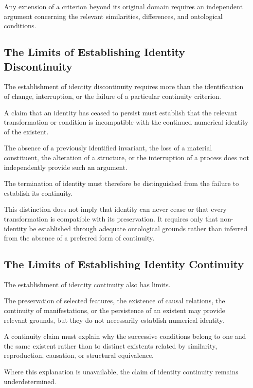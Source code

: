 Any extension of a criterion beyond its original
domain requires an independent argument concerning
the relevant similarities, differences, and
ontological conditions.

\subsection{The Limits of Establishing Identity Discontinuity}

The establishment of identity discontinuity
requires more than the identification of change,
interruption, or the failure of a particular
continuity criterion.

A claim that an identity has ceased to persist
must establish that the relevant transformation
or condition is incompatible with the continued
numerical identity of the existent.

The absence of a previously identified invariant,
the loss of a material constituent, the alteration
of a structure, or the interruption of a process
does not independently provide such an argument.

The termination of identity must therefore be
distinguished from the failure to establish
its continuity.

This distinction does not imply that identity
can never cease or that every transformation
is compatible with its preservation. It requires
only that non-identity be established through
adequate ontological grounds rather than inferred
from the absence of a preferred form of continuity.

\subsection{The Limits of Establishing Identity Continuity}

The establishment of identity continuity also
has limits.

The preservation of selected features, the
existence of causal relations, the continuity
of manifestations, or the persistence of an
existent may provide relevant grounds, but they
do not necessarily establish numerical identity.

A continuity claim must explain why the successive
conditions belong to one and the same existent
rather than to distinct existents related by
similarity, reproduction, causation, or structural
equivalence.

Where this explanation is unavailable, the claim
of identity continuity remains underdetermined.

